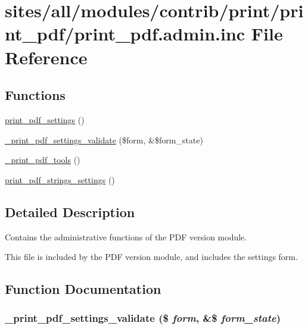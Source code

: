 \hypertarget{print__pdf_8admin_8inc}{
\section{sites/all/modules/contrib/print/print\_\-pdf/print\_\-pdf.admin.inc File Reference}
\label{print__pdf_8admin_8inc}
}
\subsection*{Functions}
\begin{CompactItemize}
\item 
\hyperlink{group__forms_g3075efa118434fae1fcb238d7426eeb4}{print\_\-pdf\_\-settings} ()
\item 
\hyperlink{print__pdf_8admin_8inc_25521e7c1e968e846c5f64fe3ad2953e}{\_\-print\_\-pdf\_\-settings\_\-validate} (\$form, \&\$form\_\-state)
\item 
\hyperlink{print__pdf_8admin_8inc_825739391462416742dd7d112121a13b}{\_\-print\_\-pdf\_\-tools} ()
\item 
\hyperlink{group__forms_g55fb8f5f7b18ed1814abfd2cadeac08b}{print\_\-pdf\_\-strings\_\-settings} ()
\end{CompactItemize}


\subsection{Detailed Description}
Contains the administrative functions of the PDF version module.

This file is included by the PDF version module, and includes the settings form. 

\subsection{Function Documentation}
\hypertarget{print__pdf_8admin_8inc_25521e7c1e968e846c5f64fe3ad2953e}{
\subsubsection[{\_\-print\_\-pdf\_\-settings\_\-validate}]{\setlength{\rightskip}{0pt plus 5cm}\_\-print\_\-pdf\_\-settings\_\-validate (\$ {\em form}, \/  \&\$ {\em form\_\-state})}}
\label{print__pdf_8admin_8inc_25521e7c1e968e846c5f64fe3ad2953e}



